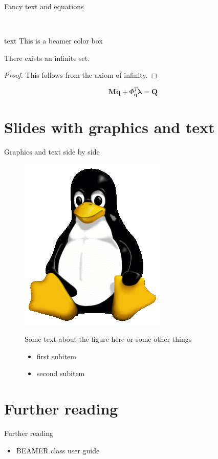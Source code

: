 \documentclass[11pt,t]{beamer}
\begin{document}
\begin{frame}{Fancy text and equations}
	\begin{center}~
		\begin{beamercolorbox}[wd=0.4\textwidth,rounded=true,center]{text}
			This is a beamer color box
		\end{beamercolorbox}
	\end{center}
	\begin{theorem}
		There exists an infinite set.
	\end{theorem}
	\begin{proof}
		This follows from the axiom of infinity.
	\end{proof}
	\vspace{4mm}
	\begin{equation}
		\textbf{M} \ddot{\textbf{q}} + \boldsymbol{\mathsf{\Phi}}_{\textbf{q}}^T \boldsymbol\lambda = \textbf{Q}
	\end{equation}
\end{frame}
\section{Slides with graphics and text}
\begin{frame}{Graphics and text side by side}
	\begin{figure}
		\begin{minipage}[b]{0.49\linewidth}
			\centering
			\includegraphics[width=.3\textwidth,natwidth=265,natheight=314]{Tux.png}
		\end{minipage}
		\hfill	
		\begin{minipage}[b]{0.5\linewidth}
			Some text about the figure here or some other things
			\begin{itemize}
				\item first subitem
				\item second subitem
			\end{itemize}
		\end{minipage}
	\end{figure}
\end{frame}
\section{Further reading}
\begin{frame}[t]{Further reading}
	\begin{itemize}
		\item BEAMER class user guide
	\end{itemize}
\end{frame}
\end{document}
